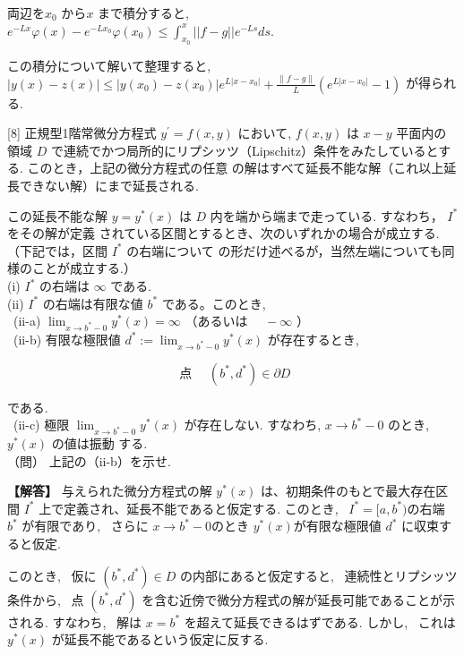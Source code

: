 \documentclass{jsarticle}
\begin{document}
両辺を$x_0$ から$x$ まで積分すると, \ 
$e^{-Lx} \varphi(x) - e^{-Lx_0}\varphi(x_0) \le \displaystyle \int_{x_0}^x ||f - g||e^{-Ls} ds$.

この積分について解いて整理すると, \ $|y(x)-z(x)| \leqslant\left|y\left(x_{0}\right)-z\left(x_{0}\right)\right| e^{L\left|x-x_{0}\right|}+\frac{\|f-g\|}{L}\left(e^{L\left|x-x_{0}\right|}-1\right)$ が得られる.



\begin{itembox}[l]{[8]}
正規型1階常微分方程式 $y^{\prime}=f(x, y)$ において, $f(x, y)$ は $x-y$ 平面内の領域 $D$ で連続でかつ局所的にリプシッツ（Lipschitz）条件をみたしているとする. このとき，上記の微分方程式の任意 の解はすべて延長不能な解（これ以上延長できない解）にまで延長される.

この延長不能な解 $y=y^{*}(x)$ は $D$ 内を端から端まで走っている. すなわち， $I^{*}$ をその解が定義 されている区間とするとき、次のいずれかの場合が成立する.（下記では，区間 $I^{*}$ の右端について の形だけ述べるが，当然左端についても同様のことが成立する.）\\
(i) $I^{*}$ の右端は $\infty$ である.\\
(ii) $I^{*}$ の右端は有限な値 $b^{*}$ である。このとき,\\
 \ (ii-a) $\lim _{x \rightarrow b^{*}-0} y^{*}(x)=\infty$ （あるいは $\quad-\infty$ ）\\
 \ (ii-b) 有限な極限値 $d^{*}:=\lim _{x \rightarrow b^{*}-0} y^{*}(x)$ が存在するとき,


\begin{equation*}
\text { 点 } \quad\left(b^{*}, d^{*}\right) \in \partial D \tag{20}
\end{equation*}


である.\\
 \ (ii-c) 極限 $\lim _{x \rightarrow b^{*}-0} y^{*}(x)$ が存在しない. すなわち, $x \rightarrow b^{*}-0$ のとき, $y^{*}(x)$ の値は振動 する.\\
（問） 上記の（ii-b）を示せ.
\end{itembox}

\noindent
\textbf{【解答】}
与えられた微分方程式の解 $y^* (x)$ は、初期条件のもとで最大存在区間 
$I^*$ 上で定義され、延長不能であると仮定する. このとき, \ $I^* = [a, b^*)$の右端 $b^*$ が有限であり, \ さらに $x \to b^* - 0$のとき $y^* (x)$が有限な極限値 
$d^*$ に収束すると仮定.

このとき, \ 仮に $(b^*, d^*) \in D$ の内部にあると仮定すると, \ 連続性とリプシッツ条件から, \ 点 $(b^*, d^*)$ を含む近傍で微分方程式の解が延長可能であることが示される. すなわち, \ 解は $x = b^*$ を超えて延長できるはずである. しかし, \ これは $y^* (x)$ が延長不能であるという仮定に反する.
\end{document}
